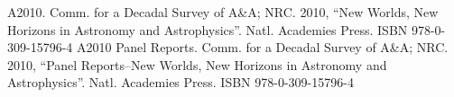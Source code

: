 \documentclass[12pt,twoside]{article}
\begin{document}
\renewcommand\refname{\large\sc References Cited}
\begin{thebibliography}{2}
\setlength{\itemsep}{-2mm}
\normalsize
{}
A2010. Comm. for a Decadal Survey of A\&A; NRC. 2010, ``New Worlds, New Horizons in Astronomy and Astrophysics''. Natl. Academies Press. ISBN 978-0-309-15796-4
A2010 Panel Reports. Comm. for a Decadal Survey of A\&A; NRC. 2010, ``Panel Reports--New Worlds, New Horizons in Astronomy and Astrophysics''. Natl. Academies Press. ISBN 978-0-309-15796-4
\end{thebibliography}
\end{document}

